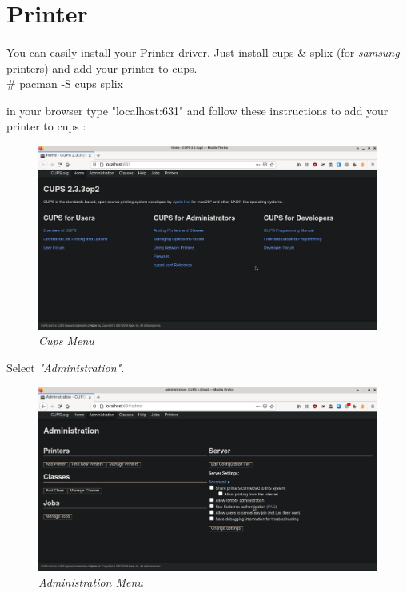 \documentclass[12pt, a4paper]{article}
\begin{document}
\section{Printer}
\paragraph{}
You can easily install your Printer driver. Just install cups \& splix (for \emph{samsung} printers) and add your printer to cups.\\
\# pacman -S cups splix\\
\par in your browser type "localhost:631" and follow these instructions to add your printer to cups :\\

\begin{large}
	\captionsetup[figure]{labelformat=empty}
	\begin{figure}[h!]
		\includegraphics[scale=0.22]{cups-1}
		\caption{\emph{Cups Menu}}
	\end{figure}
\end{large}

\begin{large}
	Select \emph{"Administration"}.
	\captionsetup[figure]{labelformat=empty}
	\begin{figure}[h!]
		\includegraphics[scale=0.22]{cups-2}
		\caption{\emph{Administration Menu}}
	\end{figure}
\end{large}
\end{document}

